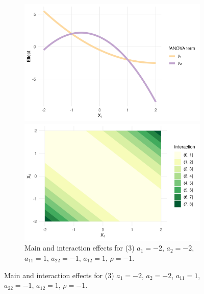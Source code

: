 \begin{figure}[htpb]
    \begin{subfigure}[t]{\textwidth}
        \centering
        \begin{minipage}[t]{0.49\textwidth}
            \includegraphics[width=\textwidth]{images/experiment_section/full_a1m20_a2m20_a11p10_a22m10_a12p10_rhom10_main.png}
        \end{minipage}%
        \hfill
        \begin{minipage}[t]{0.49\textwidth}
            \includegraphics[width=\textwidth]{images/experiment_section/full_a1m20_a2m20_a11p10_a22m10_a12p10_rhom10_interaction.png}
        \end{minipage}
        \caption{Main and interaction effects for (3) $a_1 = -2$, $a_2 = -2$, 
                 $a_{11} = 1$, $a_{22} = -1$, $a_{12} = 1$, $\rho = -1$.}
    \end{subfigure}


\end{figure}
